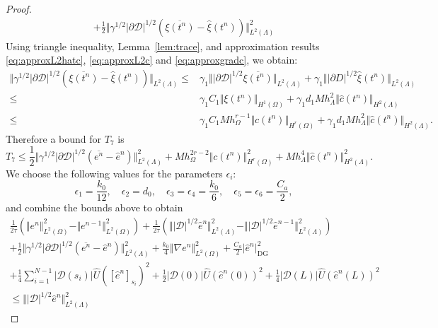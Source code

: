 \documentclass[pdflatex,sn-mathphys-num]{sn-jnl}%
\newcommand{\DG}{\mathrm{DG}}
\theoremstyle{thmstyleone}%
\theoremstyle{thmstyletwo}%
\theoremstyle{thmstylethree}%
\begin{document}
\begin{proof}
\begin{align*}
  + \frac{1}{2}
  \Vert \gamma^{1/2} \vert \partial\mathcal{D}\vert^{1/2} (\overline{\xi(t^{n})}-\hat{\xi}(t^{n})) \Vert_{L^2(\Lambda)}^2
\end{align*}
Using triangle inequality, Lemma~\ref{lem:trace}, and approximation results \eqref{eq:approxL2hatc}, \eqref{eq:approxL2c} and \eqref{eq:approxgradc}, we obtain:
\begin{align*}
\Vert \gamma^{1/2} \vert \partial\mathcal{D}\vert^{1/2} (\overline{\xi(t^{n})}-\hat{\xi}(t^{n})) \Vert_{L^2(\Lambda)}
\leq & \gamma_1 \Vert \vert \partial\mathcal{D}\vert^{1/2} \overline{\xi(t^{n})}
\Vert_{L^2(\Lambda)}
+ \gamma_1\Vert |\partial D|^{1/2} \hat \xi(t^n)\Vert_{L^2(\Lambda)}\\
\leq & \gamma_1 C_1 \Vert \xi(t^n)\Vert_{H^1(\Omega)}
+ \gamma_1 d_1 M h_\Lambda^2 \Vert \hat c(t^n)\Vert_{H^2(\Lambda)}\\
\leq & \gamma_1 C_1 M h_\Omega^{r-1} \Vert c(t^n)\Vert_{H^{r}(\Omega)}
+ \gamma_1 d_1 M h_\Lambda^2 \Vert \hat c(t^n)\Vert_{H^2(\Lambda)}.
\end{align*}
Therefore a bound for $T_7$ is
\[
T_7 \leq \frac{1}{2}
 \Vert \gamma^{1/2} \vert \partial\mathcal{D}\vert^{1/2} (\overline{e^{n}}-\hat{e}^{n}) \Vert_{L^2(\Lambda)}^2
 + M h_\Omega^{2r-2} \Vert c(t^n)\Vert_{H^{r}(\Omega)}^2 + M h_\Lambda^4 \Vert \hat c(t^n)\Vert_{H^2(\Lambda)}^2.
\]
We choose the following values for the parameters $\epsilon_i$:
\[
\epsilon_1 =  \frac{k_0}{12}, \quad
\epsilon_2 = d_0,\quad
\epsilon_3 =
\epsilon_4 =  \frac{k_0}{6}, \quad
\epsilon_5 = 
\epsilon_6 = \frac{C_a}{2},
\]
and combine the bounds above to obtain
\begin{align}
    \frac{1}{2\tau} \left(
\Vert   e^n \Vert_{L^2(\Omega)}^2
-\Vert  e^{n-1} \Vert_{L^2(\Omega)}^2\right)
    + \frac{1}{2\tau} \left(
\Vert \vert \mathcal{D}\vert^{1/2} \hat e^n \Vert_{L^2(\Lambda)}^2
-\Vert \vert \mathcal{D}\vert^{1/2} \hat e^{n-1} \Vert_{L^2(\Lambda)}^2\right)
 \nonumber\\
+ \frac12 \Vert \gamma^{1/2} \vert \partial\mathcal{D}\vert^{1/2} (\overline{e^{n}}-\hat{e}^{n}) \Vert_{L^2(\Lambda)}^2
+\frac{k_0}{4}  \Vert \nabla e^n \Vert_{L^2(\Omega)}^2
+ \frac{C_a}{2} \vert \hat e^n \vert_{\DG}^2
\nonumber\\
+\frac14 \sum_{i=1}^{N-1}  \vert \mathcal{D}(s_i)\vert \hat U ([\hat e^n]_{s_i})^2
+\frac12 \vert \mathcal{D}(0)\vert \hat U (\hat e^n(0))^2
 +\frac14 \vert \mathcal{D}(L)\vert \hat U (\hat e^n(L))^2
 \nonumber\\
     \leq  \Vert \vert \mathcal{D}\vert^{1/2} \hat e^n \Vert_{L^2(\Lambda)}^2

\end{align}
\end{proof}
\end{document}
